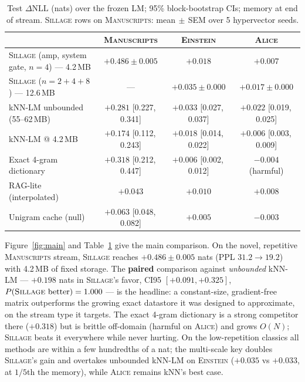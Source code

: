 \documentclass[11pt]{article}
\newcommand{\sillage}{\textsc{Sillage}}
\newcommand{\dnll}{\Delta\mathrm{NLL}}
\newcommand{\ci}[2]{{\footnotesize[#1,\,#2]}}
\begin{document}
\begin{table}[t]
\centering\small
\caption{Test $\dnll$ (nats) over the frozen LM; 95\% block-bootstrap CIs; memory at end of stream. \sillage{} rows on \textsc{Manuscripts}: mean$\,\pm\,$SEM over 5 hypervector seeds.}
\label{tab:main}
\begin{tabular}{@{}lccc@{}}
\toprule
& \textsc{Manuscripts} & \textsc{Einstein} & \textsc{Alice}\\
\midrule
\sillage{} (amp, system gate, $n{=}4$) --- 4.2\,MB & $\mathbf{+0.486 \pm 0.005}$ & $+0.018$ & $+0.007$\\
\sillage{} ($n{=}2{+}4{+}8$) --- 12.6\,MB & --- & $\mathbf{+0.035 \pm 0.000}$ & $+0.017 \pm 0.000$\\
kNN-LM unbounded (55--62\,MB) & $+0.281$ \ci{0.227}{0.341} & $+0.033$ \ci{0.027}{0.037} & $\mathbf{+0.022}$ \ci{0.019}{0.025}\\
kNN-LM @ 4.2\,MB & $+0.174$ \ci{0.112}{0.243} & $+0.018$ \ci{0.014}{0.022} & $+0.006$ \ci{0.003}{0.009}\\
Exact 4-gram dictionary & $+0.318$ \ci{0.212}{0.447} & $+0.006$ \ci{0.002}{0.012} & $-0.004$ (harmful)\\
RAG-lite (interpolated) & $+0.043$ & $+0.010$ & $+0.008$\\
Unigram cache (null) & $+0.063$ \ci{0.048}{0.082} & $+0.005$ & $-0.003$\\
\bottomrule
\end{tabular}
\end{table}

Figure~\ref{fig:main} and Table~\ref{tab:main} give the main comparison. On the novel, repetitive \textsc{Manuscripts} stream, \sillage{} reaches $+0.486\pm0.005$ nats (PPL $31.2 \to 19.2$) with 4.2\,MB of fixed storage. The \textbf{paired} comparison against \emph{unbounded} kNN-LM --- $+0.198$ nats in \sillage's favor, CI95 $[+0.091, +0.325]$, $P(\text{\sillage{} better})=1.000$ --- is the headline: a constant-size, gradient-free matrix outperforms the growing exact datastore it was designed to approximate, on the stream type it targets. The exact 4-gram dictionary is a strong competitor there ($+0.318$) but is brittle off-domain (harmful on \textsc{Alice}) and grows $O(N)$; \sillage{} beats it everywhere while never hurting. On the low-repetition classics all methods are within a few hundredths of a nat; the multi-scale key doubles \sillage's gain and overtakes unbounded kNN-LM on \textsc{Einstein} ($+0.035$ vs $+0.033$, at $1/5$th the memory), while \textsc{Alice} remains kNN's best case.
\end{document}
